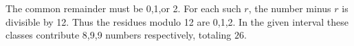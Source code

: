 The common remainder must be 0,1,or 2. For each such $r$, the number minus $r$ is divisible by 12. Thus the residues modulo 12 are 0,1,2. In the given interval these classes contribute 8,9,9 numbers respectively, totaling $\boxed{26}$.
